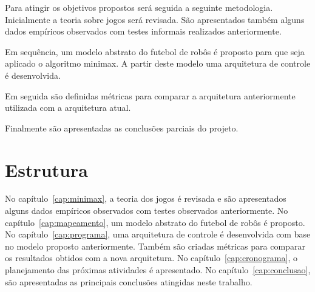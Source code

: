 Para atingir os objetivos propostos será seguida a seguinte metodologia.
Inicialmente a teoria sobre jogos será revisada. São apresentados também
alguns dados empíricos observados com testes informais realizados anteriormente.

Em sequência, um modelo abstrato do futebol de robôs é proposto para que seja
aplicado o algoritmo minimax. A partir deste modelo uma arquitetura de controle
é desenvolvida.

Em seguida são definidas métricas para comparar a arquitetura anteriormente
utilizada com a arquitetura atual.

Finalmente são apresentadas as conclusões parciais do projeto.

\section{Estrutura}

No capítulo~\ref{cap:minimax}, a teoria dos jogos é revisada e são apresentados
alguns dados empíricos observados com testes observados anteriormente.
No capítulo~\ref{cap:mapeamento}, um modelo abstrato do futebol de robôs é
proposto.
No capítulo~\ref{cap:programa}, uma arquitetura de controle é desenvolvida com
base no modelo proposto anteriormente. Também são criadas métricas para
comparar os resultados obtidos com a nova arquitetura.
No capítulo~\ref{cap:cronograma}, o planejamento das próximas atividades é
apresentado.
No capítulo~\ref{cap:conclusao}, são apresentadas as principais conclusões
atingidas neste trabalho.
